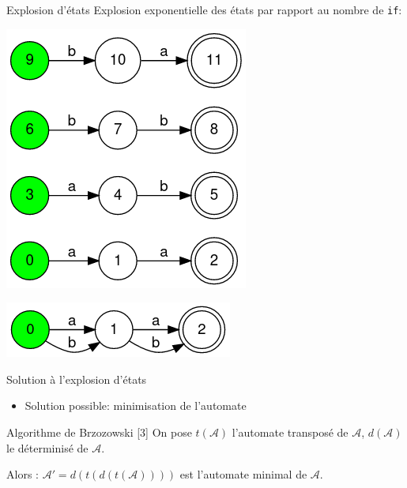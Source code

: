 \documentclass{beamer}
\begin{document}
\begin{frame}{Explosion d'états} %
  Explosion exponentielle des états par rapport au nombre de \texttt{if}:
  
  \begin{minipage}{0.49\linewidth}
    \includegraphics[width=0.8\linewidth]{ expl1 }
  \end{minipage}
  \hfill
  \begin{minipage}{0.4\linewidth}
    \includegraphics[width=\linewidth]{ expl2 }
  \end{minipage}
\end{frame}


\begin{frame}{Solution à l'explosion d'états}
  \begin{itemize}
    \item Solution possible: minimisation de l'automate
  \end{itemize}
    \begin{alertblock}{Algorithme de Brzozowski [3]}
      On pose $t(\mathcal{A})$ l'automate transposé de $\mathcal{A}$, $d(\mathcal{A})$ le déterminisé de $\mathcal{A}$.
      
      Alors : $\mathcal{A}' = d(t(d(t(\mathcal{A}))))$ est l'automate minimal de $\mathcal{A}$.
    \end{alertblock}
\end{frame}
\end{document}
